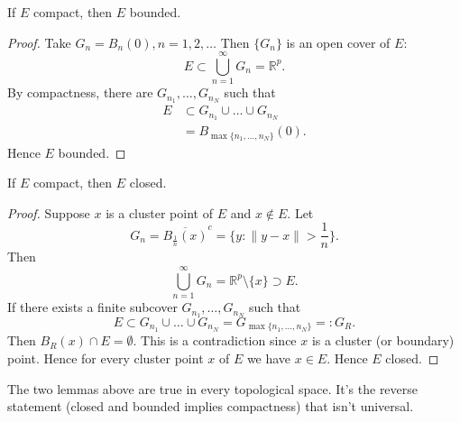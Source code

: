 \begin{lemma}
	If $E$ compact, then $E$ bounded.
\end{lemma}
\begin{proof}
	Take $G_{n} = B_n(0) , n = 1,2,\ldots$
	Then $\{G_n\} $ is an open cover of $E$: \[
		E \subset \bigcup_{n=1} ^\infty G_n = \mathbb{R}^p
	.\] 
	By compactness, there are $G_{n_1}, \ldots, G_{n_N}$ such that \begin{align*}
		E &\subset G_{n_1}\cup \ldots \cup G_{n_N}\\
		&= B_{\max \{n_1, \ldots, n_N\} }(0)
	.\end{align*} 
	Hence $E$ bounded.
\end{proof}
\begin{lemma}
	If $E$ compact, then $E $ closed.
\end{lemma}
\begin{proof}
	Suppose $x$ is a cluster point of $E$ and $x \not\in E$. Let \[
		G_n = \overline{B_{\frac{1}{n}}(x)} ^c = \{y : \|y - x\| >  \frac{1}{n}\} 
	.\] 
	Then \[
		\bigcup_{n = 1} ^\infty G_n = \mathbb{R}^p \setminus \{x\} 
		\supset E
	.\] 
	If there exists a finite subcover $G_{n_1}, \ldots, G_{n_N}$ such that \[
		E \subset G_{n_1} \cup \ldots \cup G_{n_N} = G_{\max \{n_1, \ldots, n_N\} } =: G_R
	.\] 
	Then $B_R(x) \cap E = \emptyset $. This is a contradiction since $x$ is a cluster (or boundary) point. Hence for every cluster point $x$ of $E$ we have $x \in E$.
	Hence $E$ closed.
\end{proof}
\begin{remark}
	The two lemmas above are true in every topological space. It's the reverse statement (closed and bounded implies compactness) that isn't universal.
\end{remark}

